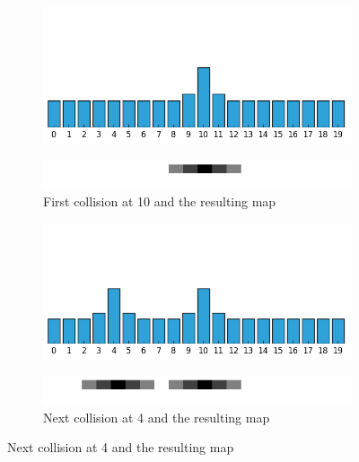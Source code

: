 \begin{exmp}
\begin{figure}
\centering
\begin{minipage}{0.48\textwidth}
\centering
\begin{subfigure}{\textwidth}
\centering
\includegraphics[scale=0.4]{./images/ex24/ex24coll10.png}
\end{subfigure}
\begin{subfigure}{\textwidth}
\centering
\includegraphics[scale=0.4]{./images/ex24/ex24wall10.png}
\caption{First collision at 10 and the resulting map}
\end{subfigure}
\end{minipage}
\begin{minipage}{0.48\textwidth}
\centering
\begin{subfigure}{\textwidth}
\centering
\includegraphics[scale=0.4]{./images/ex24/ex24coll4.png}
\end{subfigure}
\begin{subfigure}{\textwidth}
\centering
\includegraphics[scale=0.4]{./images/ex24/ex24wall4.png}
\caption{Next collision at 4 and the resulting map}
\end{subfigure}
\end{minipage}


\end{figure}
\end{exmp}
